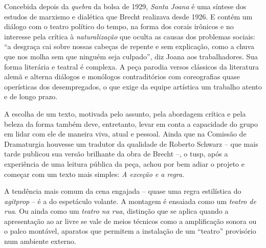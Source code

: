 Concebida depois da {\it quebra} da bolsa de 1929, {\it Santa Joana} é
uma síntese dos estudos de marxismo e dialética que Brecht realizava
desde 1926. E contém um diálogo com o teatro político do tempo, na forma
dos corais irônicos e no interesse pela crítica à {\it naturalização}
que oculta as causas dos problemas sociais: “a desgraça cai sobre nossas
cabeças de repente e sem explicação, como a chuva que nos molha sem que
ninguém seja culpado”, diz Joana aos trabalhadores. Sua forma literária
e teatral é complexa. A peça parodia versos clássicos da literatura
alemã e alterna diálogos e monólogos contraditórios com coreografias
quase operísticas dos desempregados, o que exige da equipe artística um
trabalho atento e de longo prazo.

A escolha de um texto, motivada pelo assunto, pela abordagem crítica e
pela beleza da forma também deve, entretanto, levar em conta a
capacidade do grupo em lidar com ele de maneira viva, atual e pessoal.
Ainda que na Comissão de Dramaturgia houvesse um tradutor da qualidade
de Roberto Schwarz -- que mais tarde publicou sua versão brilhante da
obra de Brecht --, o {\sc tusp}, após a experiência de uma leitura pública da
peça, achou por bem adiar o projeto e começar com um texto mais simples:
{\it A exceção e a regra}.


\subject{Modelos de teatralidade: a cena volante}


A tendência mais comum da cena engajada -- quase uma regra estilística do
{\it agitprop} -- é a do espetáculo volante. A montagem é ensaiada como
um {\it teatro de rua}. Ou ainda como um {\it teatro na rua}, distinção
que se aplica quando a apresentação ao ar livre se vale de meios
técnicos como a amplificação sonora ou o palco montável, aparatos que
permitem a instalação de um “teatro” provisório num ambiente externo.

